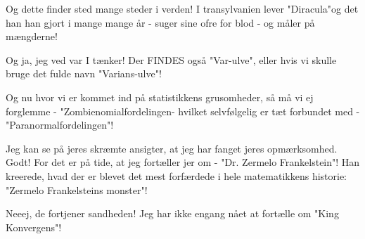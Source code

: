 \documentclass[a4paper,11pt]{article}
\begin{document}
\begin{sketch}
 Og dette finder sted mange steder i verden! I transylvanien lever "Diracula"og det han han gjort i mange mange år - suger sine ofre for blod - og måler på mængderne!

 Og ja, jeg ved var I tænker! Der FINDES også "Var-ulve", eller hvis vi skulle bruge det fulde navn "Varians-ulve"!

 Og nu hvor vi er kommet ind på statistikkens grusomheder, så må vi ej forglemme - "Zombienomialfordelingen- hvilket selvfølgelig er tæt forbundet med - "Paranormalfordelingen"!

 Jeg kan se på jeres skræmte ansigter, at jeg har fanget jeres opmærksomhed. Godt! For det er på tide, at jeg fortæller jer om - "Dr. Zermelo Frankelstein"! Han kreerede, hvad der er blevet det mest forfærdede i hele matematikkens historie: "Zermelo Frankelsteins monster"!


 Neeej, de fortjener sandheden! Jeg har ikke engang nået at fortælle om "King Konvergens"!
\end{sketch}
\end{document}
